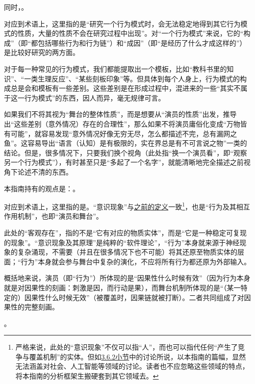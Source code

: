 同时，。
\begin{explain}
对应到术语上，这里指的是“研究一个行为模式时，会无法稳定地得到其它行为模式的性质，大量的性质不会在研究过程中出现”。对“一个行为模式”来说，它的“构成”（即“都包括哪些行为和行为链”）和“成因”（即“是经历了什么才成这样的”）是比较好研究的两方面。

对于每一种常见的行为模式，我们都能提取出一个模板，比如“教科书里的知识”、“一类生理反应”、“某些刻板印象”等。但具体到每个人身上，行为模式的构成总是会和模板有一些差别。这些差别是在形成过程中，混进来的一些“其实不属于这一行为模式”的东西，因人而异，毫无规律可言。

如果我们不将其视为“舞台的整体性质”，而是想要从“演员的性质”出发，推导出“这些差别（意外情况）存在的合理性”，那么如果不将演员庸俗化变成“万物皆有可能”，就容易发现“意外情况好像无穷无尽，怎么都描述不完，总有漏网之鱼”。这容易导出“语言（认知）是有极限的，实在界总是有不可言说之物”一类的结论。但是，很多情况下，只要我们换个视角（此处指“换一个演员看”，即“观察另一个行为模式”），有时甚至只是“多起了一个名字”，就能清晰地完全描述之前视角下论述不清的东西。
\end{explain}
本指南持有的观点是：。
\begin{explain}
对应到术语上，这里指的是。“意识现象”与\hyperref[sec:人的意识演化基本模型]{之前的定义}一致\footnote{严格来说，此处的“意识现象”不仅可以指“人”，而也可以指代任何“产生了竞争与覆盖机制”的实体。但如\hyperref[sec:澄清与叠甲]{3.6.2小节}中的讨论所说，以本指南的篇幅，显然无法涵盖对社会、人工智能等领域的讨论。读者也不应忽略这些领域的特点，将本指南的分析框架生搬硬套到其它领域去。}，也是“行为及其相互作用机制”，也即“演员和舞台”。

此处的“客观存在”，指的不是“它有对应的物质实体”，而是“它是一种稳定可复现的现象”。“意识现象及其原理”是纯粹的“软件理论”，“行为”本身就来源于神经现象的复杂涌现，不需要（并且在很多情况下也不可能）将其还原至物质实体的层面；“行为”本身就会参与舞台中复杂的演化，不应将所有行为都还原为外部输入。

概括地来说，演员（即“行为”）所体现的是“因果性什么时候有效”（因为行为本身就是对因果性的刻画：刺激是因，而行动是果），而舞台机制所体现的是“（某一特定的）因果性什么时候无效”（被覆盖时，因果链就被打断）。二者共同组成了对因果性的完整刻画。
\end{explain}
。
